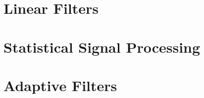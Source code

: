 \section{Linear Filters}


\section{Statistical Signal Processing}



\section{Adaptive Filters}



